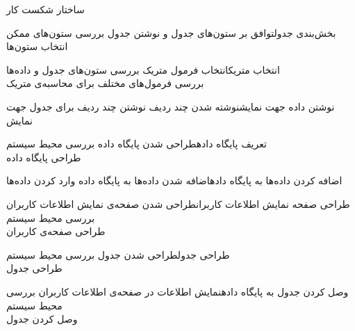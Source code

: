 \begin{wbsbox}{ساختار شکست کار}
\begin{wbssub}{بخش‌بندی جدول}{توافق بر ستون‌های جدول و نوشتن جدول}
\task بررسی ستون‌های ممکن \\
\task انتخاب ستون‌ها
\end{wbssub}

\begin{wbssub}{انتخاب متریک}{انتخاب فرمول متریک}
\task بررسی ستون‌های جدول و داده‌ها\\
\task بررسی فرمول‌های مختلف ‌برای محاسبه‌ی متریک
\end{wbssub}

\begin{wbssub}{نوشتن داده جهت نمایش}{نوشته شدن چند ردیف}
\task نوشتن چند ردیف برای جدول جهت نمایش
\end{wbssub}

\begin{wbssub}{تعریف پایگاه داده}{طراحی شدن پایگاه داده}
\task بررسی محیط سیستم  \\
\task طراحی پایگاه داده
\end{wbssub}

\begin{wbssub}{اضافه کردن داده‌ها به پایگاه داده}{اضافه شدن داده‌ها به پایگاه داده}
\task وارد کردن داده‌ها
\end{wbssub}

\begin{wbssub}{طراحی صفحه نمایش اطلاعات کاربران}{طراحی شدن صفحه‌ی نمایش اطلاعات کاربران}
\task بررسی محیط سیستم  \\
\task طراحی صفحه‌ی کاربران
\end{wbssub}

\begin{wbssub}{طراحی جدول}{طراحی شدن جدول}
\task بررسی محیط سیستم  \\
\task طراحی جدول
\end{wbssub}

\begin{wbssub}{وصل کردن جدول به پایگاه داده}{نمایش اطلاعات در صفحه‌ی اطلاعات کاربران}
\task بررسی محیط سیستم  \\
\task وصل کردن جدول
\end{wbssub}
\end{wbsbox}
